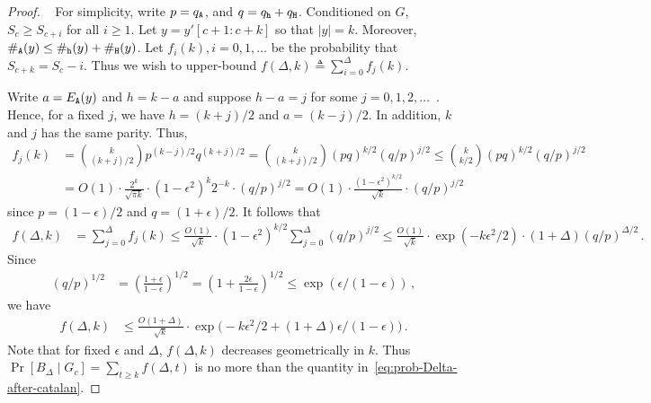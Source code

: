 \begin{proof}~
  For simplicity, write $p = q_{\mathtt{A}}$, and $q = q_{\mathtt{h}} + q_{\mathtt{H}}$. 
  Conditioned on $G$, $S_c \geq S_{c + i}$ for all $i \geq 1$. 
  Let $y = y'[c + 1 : c + k]$ so that $|y| = k$.
  Moreover, $\#_{\mathtt{A}}(y) \leq \#_{\mathtt{h}}(y) + \#_{\mathtt{H}}(y)$. 
  Let $f_i(k), i = 0, 1, \ldots$ be the probability that 
  $S_{c + k} = S_c - i$. 
  Thus we wish to upper-bound $f(\Delta, k) \triangleq \sum_{i = 0}^\Delta f_j(k)$.

  Write $a = E_{\mathtt{A}}(y)$ and $h = k - a$ 
  and suppose $h - a = j$ for some $j = 0, 1, 2, \ldots$\ .
  Hence, for a fixed $j$, we have $h = (k+j)/2$ and $a = (k-j)/2$. 
  In addition, $k$ and $j$ has the same parity.
  Thus, 
  \begin{align*}
    f_j(k) 
    &= {k\choose (k+j)/2} p^{(k-j)/2} q^{(k+j)/2} 
    = {k\choose (k+j)/2} (pq)^{k/2} (q/p)^{j/2} 
    \leq {k\choose k/2} (pq)^{k/2} (q/p)^{j/2} \\
    &= O(1)\cdot \frac{2^k}{\sqrt{\pi k}} \cdot (1 - \epsilon^2)^k 2^{-k} \cdot (q/p)^{j/2} 
    = O(1)\cdot  \frac{(1 - \epsilon^2)^{k/2}}{\sqrt{k}} \cdot (q/p)^{j/2}
  \end{align*}
  since $p = (1 - \epsilon)/2$ and $q = (1+\epsilon)/2$. 
  It follows that 
  \begin{align*}
    f(\Delta, k) &=\sum_{j = 0}^\Delta f_j(k) 
    \leq \frac{O(1)}{\sqrt{k}}\cdot  (1 - \epsilon^2)^{k/2} \sum_{j = 0}^\Delta (q/p)^{j/2}
    \leq \frac{O(1)}{\sqrt{k}}\cdot  \exp(- k \epsilon^2/2) \cdot (1 + \Delta) (q/p)^{\Delta/2}
    \,.
  \end{align*}
  Since 
  \begin{align*}
    (q/p)^{1/2}
    &= \left(\frac{1+\epsilon}{1 - \epsilon}\right)^{1/2}
    = \left(1 + \frac{2\epsilon}{1 - \epsilon}\right)^{1/2} 
    \leq \exp(\epsilon/(1 - \epsilon)) 
    \,,
  \end{align*}
  we have 
  \begin{align*}
    f(\Delta, k)
    &\leq \frac{O(1 + \Delta)}{\sqrt{k}}\cdot \exp\bigl(-k \epsilon^2/2 + (1 + \Delta) \epsilon/(1 - \epsilon) \bigr)
    \,.
  \end{align*}
  Note that for fixed $\epsilon$ and $\Delta$, $f(\Delta, k)$ decreases geometrically in $k$. 
  Thus $\Pr[B_\Delta \mid G_c] = \sum_{t \geq k} f(\Delta, t)$ 
  is no more than the quantity in~\eqref{eq:prob-Delta-after-catalan}.
\end{proof}


